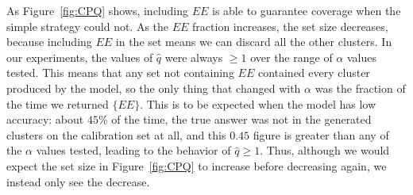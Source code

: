 \documentclass{scrartcl}
\begin{document}
As Figure~\ref{fig:CPQ} shows, including $EE$ is able to guarantee coverage when the simple strategy could not.
As the $EE$ fraction increases, the set size decreases, because including $EE$ in the set means we can discard all the other
clusters.
In our experiments, the values of $\hat{q}$ were always $\ge 1$ over the range of $\alpha$ values tested.
This means that any set not containing $EE$ contained every cluster produced by the model,
so the only thing that changed with $\alpha$ was the fraction of the time we returned $\{EE\}$.
This is to be expected when the model has low accuracy: about $45\%$ of the time,
the true answer was not in the generated clusters on the calibration set at all,
and this $0.45$ figure is greater than any of the $\alpha$ values tested, leading to the behavior of $\hat{q} \ge 1$. 
Thus, although we would expect the set size in Figure~\ref{fig:CPQ} to increase before decreasing again, we instead 
only see the decrease. \medskip
\end{document}
